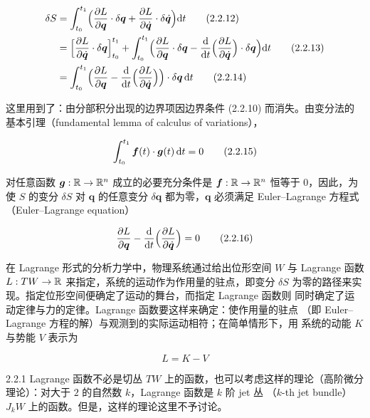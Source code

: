 \begin{align}
  \delta S &= \int_{t_0}^{t_1}
    \Bigl(\frac{\partial L}{\partial\bm{q}}\cdot\delta\bm{q}
      + \frac{\partial L}{\partial\dot{\bm{q}}}\cdot\delta\dot{\bm{q}}
    \Bigr)\mathrm{d} t \tag{2.2.12}\\
  &= \Bigl[\frac{\partial L}{\partial\dot{\bm{q}}}\cdot\delta\bm{q}
    \Bigr]_{t_0}^{t_1}
    + \int_{t_0}^{t_1}
    \Bigl(\frac{\partial L}{\partial\bm{q}}\cdot\delta\bm{q}
      - \frac{\mathrm{d}}{\mathrm{d} t}\Bigl(\frac{\partial L}{\partial\dot{\bm{q}}}
      \Bigr)\cdot\delta\bm{q}\Bigr)\mathrm{d} t \tag{2.2.13}\\
  &= \int_{t_0}^{t_1}
    \Bigl(\frac{\partial L}{\partial\bm{q}}
      - \frac{\mathrm{d}}{\mathrm{d} t}\Bigl(\frac{\partial L}{\partial\dot{\bm{q}}}
      \Bigr)\Bigr)\cdot\delta\bm{q}\,\mathrm{d} t \tag{2.2.14}
\end{align}

这里用到了：由分部积分出现的边界项因边界条件 (2.2.10) 而消失。由变分法的
基本引理（fundamental lemma of calculus of variations），

\begin{equation}
  \int_{t_0}^{t_1} \bm{f}(t)\cdot\bm{g}(t)\,\mathrm{d} t = 0
  \tag{2.2.15}
\end{equation}

对任意函数 $\bm{g}:\mathbb{R}\to\mathbb{R}^n$ 成立的必要充分条件是 $\bm{f}:\mathbb{R}\to\mathbb{R}^n$
恒等于 $0$，因此，为使 $S$ 的变分 $\delta S$ 对 $\bm{q}$ 的任意变分
$\delta\bm{q}$ 都为零，$\bm{q}$ 必须满足 Euler--Lagrange 方程式
（Euler--Lagrange equation）

\begin{equation}
  \frac{\partial L}{\partial\bm{q}}
    - \frac{\mathrm{d}}{\mathrm{d} t}\Bigl(\frac{\partial L}{\partial\dot{\bm{q}}}\Bigr)
    = 0
  \tag{2.2.16}
\end{equation}

在 Lagrange 形式的分析力学中，物理系统通过给出位形空间 $W$ 与 Lagrange
函数 $L:TW\to\mathbb{R}$ 来指定，系统的运动作为作用量的驻点，即变分 $\delta S$
为零的路径来实现。指定位形空间便确定了运动的舞台，而指定 Lagrange 函数则
同时确定了运动定律与力的定律。Lagrange 函数要这样来确定：使作用量的驻点
（即 Euler--Lagrange 方程的解）与观测到的实际运动相符；在简单情形下，用
系统的动能 $K$ 与势能 $V$ 表示为

\begin{equation}
  L = K - V
  \tag{2.2.17}
\end{equation}

\begin{remark}{2.2.1}
Lagrange 函数不必是切丛 $TW$ 上的函数，也可以考虑这样的理论（高阶微分
理论）：对大于 $2$ 的自然数 $k$，Lagrange 函数是 $k$ 阶 jet 丛
（$k$-th jet bundle）$J_kW$ 上的函数。但是，这样的理论这里不予讨论。
\end{remark}

